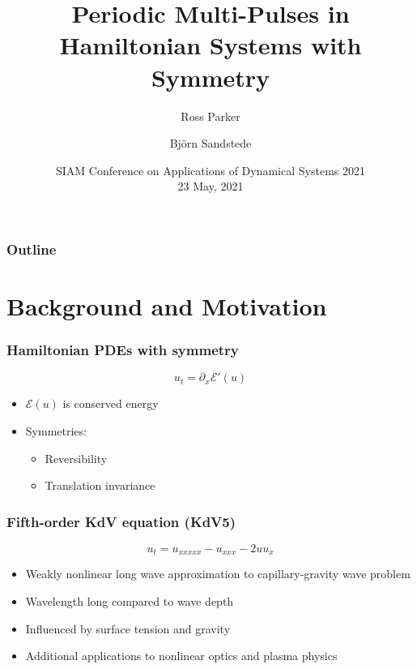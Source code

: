 \documentclass[16pt]{beamer}
\title[Instability Bubbles]{Periodic Multi-Pulses in Hamiltonian Systems with Symmetry}
\author[Parker, R.] %
{Ross Parker\inst{1} \and Bj\"{o}rn Sandstede\inst{2}}
\institute[SMU] %
{
  \inst{1}
  Southern Methodist University
  \and
  \inst{2}
  Brown University
}
\date[23 May, 2021]
{SIAM Conference on Applications of Dynamical Systems 2021 \\ 23 May, 2021}
\begin{document}
 
\frame{\titlepage}
 
\begin{frame}
\frametitle{Outline}
\tableofcontents
\end{frame}

\section{Background and Motivation}

\begin{frame}
	\frametitle{Hamiltonian PDEs with symmetry}   
	\begin{center}
	\Large
		\[ u_t = \partial_x \mathcal{E}'(u) \]
	\end{center}

	\begin{itemize}
		\item $\mathcal{E}(u)$ is conserved energy
		\vspace{0.5cm}
		\item Symmetries:
		\begin{itemize}
			\item Reversibility
			\item Translation invariance
		\end{itemize}
	\end{itemize}
\end{frame}

\begin{frame}
	\frametitle{Fifth-order KdV equation (KdV5)}   
	\begin{center}
	\Large
		\[ u_t = u_{xxxxx} - u_{xxx} - 2 u u_x  \]
	\end{center}

	\begin{itemize}
		\item Weakly nonlinear long wave approximation to capillary-gravity wave problem
		\item Wavelength long compared to wave depth
		\item Influenced by surface tension and gravity
		\item Additional applications to nonlinear optics and plasma physics
	\end{itemize}
\end{frame}
\end{document}
